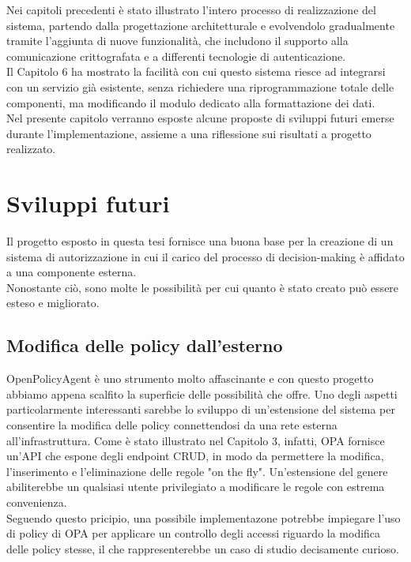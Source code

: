Nei capitoli precedenti è stato illustrato l'intero processo di realizzazione del sistema, partendo dalla
progettazione architetturale e evolvendolo gradualmente tramite l'aggiunta di nuove funzionalità, che includono il supporto alla comunicazione crittografata 
e a differenti tecnologie di autenticazione. 
\\ Il Capitolo 6 ha mostrato la facilità 
con cui questo sistema riesce ad integrarsi con un servizio già esistente, senza richiedere una 
riprogrammazione totale delle componenti, ma modificando il modulo dedicato alla formattazione dei dati. 
\\ Nel presente capitolo verranno esposte alcune proposte di sviluppi futuri emerse durante l'implementazione, assieme a una riflessione
 sui risultati a progetto realizzato. 

\section{Sviluppi futuri}
Il progetto esposto in questa tesi fornisce una buona base per la creazione di un sistema di autorizzazione 
in cui il carico del processo di decision-making è affidato a una componente esterna.  
\\ Nonostante ciò, sono molte le possibilità per cui quanto è stato creato può essere esteso e migliorato. 

\subsection{Modifica delle policy dall'esterno}
OpenPolicyAgent è uno strumento molto affascinante e con questo progetto abbiamo 
appena scalfito la superficie delle possibilità che offre. Uno degli aspetti particolarmente interessanti 
sarebbe lo sviluppo di un'estensione del sistema per consentire la modifica delle policy connettendosi da una 
rete esterna all'infrastruttura. Come è stato illustrato nel Capitolo 3, infatti, OPA fornisce un'API che espone degli 
endpoint CRUD, in modo da permettere la modifica, l'inserimento e l'eliminazione delle regole "on the fly".
Un'estensione del genere abiliterebbe un qualsiasi utente privilegiato a modificare le regole con estrema
 convenienza.   
\\ Seguendo questo pricipio, una possibile implementazone potrebbe impiegare l'uso di policy di OPA per applicare un controllo degli accessi 
riguardo la modifica delle policy stesse, il che rappresenterebbe un caso di studio decisamente curioso. 

